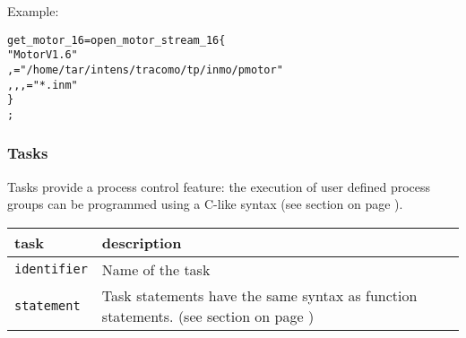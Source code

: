 Example:


\begin{boxedminipage}[t]{\linewidth}
\begin{alltt}
  \FILESTREAM
      get_motor_16 = open_motor_stream_16 \{
         "Motor V1.6"
        ,\PROCESS="/home/tar/intens/tracomo/tp/inmo/pmotor"
        ,\READONLY, \RESET, \FILTER="*.inm"
        \}
 ;
\end{alltt}
\end{boxedminipage}



\newpage
\subsubsection{Tasks}
\label{sec:optasks}
Tasks provide a process control feature:
the execution of user defined process groups can be programmed using
a C-like syntax
(see section  on page \pageref{sec:functions}).



\begin{tabularx}{\textwidth}{l|X}
task              & description\\
\hline
\verb+identifier+ & Name of the task\\
\verb+statement+  & Task statements have the same syntax as function statements.
                        (see section \nameref{sec:functions} on page \pageref{sec:functions})\\
\end{tabularx}




